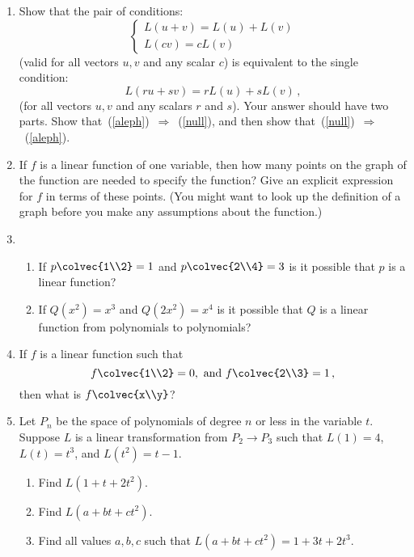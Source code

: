 


\begin{enumerate}
\item Show that the pair of conditions:
\begin{equation}\label{aleph}\left\{
\begin{array}{l}L(u+v) = L(u)+L(v)\\[1mm]L(cv) = cL(v) \end{array}\right.\tag{1}
\end{equation}
(valid for all vectors $u,v$ and any scalar $c$) is equivalent to the single condition:
\begin{equation}\label{null}L(ru + sv) = rL(u) + sL(v)\, ,\tag{2}\end{equation}
(for all vectors $u,v$ and any scalars $r$ and $s$).
Your answer should have two parts.  Show that~(\ref{aleph})~$\Rightarrow$~(\ref{null}), and then show that~(\ref{null})~$\Rightarrow$~(\ref{aleph}).


\item If $f$ is a linear function of one variable, then how many points on the graph of the function are needed to specify the function? Give an explicit expression for $f$ in terms of these points. (You might want to look up the definition of a graph before you make any assumptions about the function.)

\item 
\begin{enumerate}\item If $p\colvec{1\\2}=1$ and $p\colvec{2\\4}=3$ is it possible that $p$ is a linear function? 
\item
 If $Q(x^2)=x^3$ and $Q(2x^2)=x^4$ is it possible that $Q$ is a linear function from polynomials to polynomials? 
\end{enumerate}


\item If $f$ is a linear function such that 
$$f\colvec{1\\2}=0{\rm ,~and~} f\colvec{2\\3}=1\, ,$$ 
then what is $f\colvec{x\\y}$?


\item \label{polyprob}Let $P_n$ be the space of polynomials of degree $n$ or less in the variable $t$.  Suppose $L$ is a linear transformation from $P_2 \rightarrow P_3$ such that
$L(1) = 4$, $L(t)=t^3$, and $L(t^2) = t-1$.
\begin{enumerate}
\item Find $L(1+t+2t^2)$.
\item Find $L(a+bt+ct^2)$.
\item Find all values $a,b,c$ such that $L(a+bt+ct^2)=1+3t+2t^3$.
\end{enumerate}


\end{enumerate}
